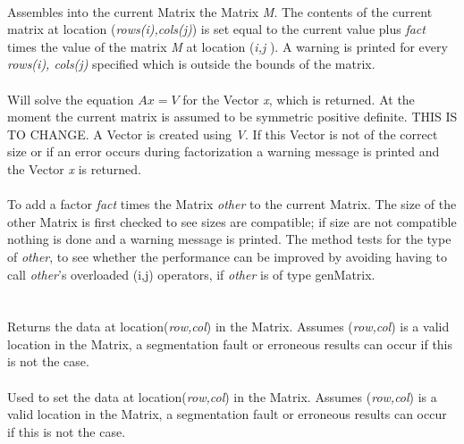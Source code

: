  \\
Assembles into the current Matrix the Matrix {\em M}. The contents of the
current matrix at location ({\em rows(i),cols(j)}) is set equal to the
current value plus {\em fact} times the value of the matrix {\em M}
at location ({\em i,j }). A warning is printed for every {\em rows(i),
cols(j)} specified which is outside the bounds of the matrix. \\

 \\
Will solve the equation {\em $Ax=V$} for the Vector {\em x}, which is
returned. At the moment the current matrix is assumed to be symmetric
positive definite. THIS IS TO CHANGE. A Vector is created using
{\em V}. If this Vector is not of the correct size or if an error occurs
during factorization a warning message is printed and the Vector {\em x}
is returned. \\ 

 \\ 
To add a factor {\em fact} times the Matrix {\em other} to the current
Matrix. The size of the other Matrix is first checked to see sizes are 
compatible; if size are not compatible nothing is done and a warning
message is printed. The method tests for the type of {\em other}, to see
whether the performance can be improved by avoiding having to call
{\em other}'s overloaded (i,j) operators, if {\em other} is of type
genMatrix. \\ 


  \\
 \\
Returns the data at location({\em row,col}) in the Matrix. Assumes
({\em row,col}) is a valid location in the Matrix, a segmentation
fault or erroneous results can occur if this is not the case.\\

 \\
Used to set the data at location({\em row,col}) in the Matrix. Assumes
({\em row,col}) is a valid location in the Matrix, a segmentation
fault or erroneous results can occur if this is not the case. \\

